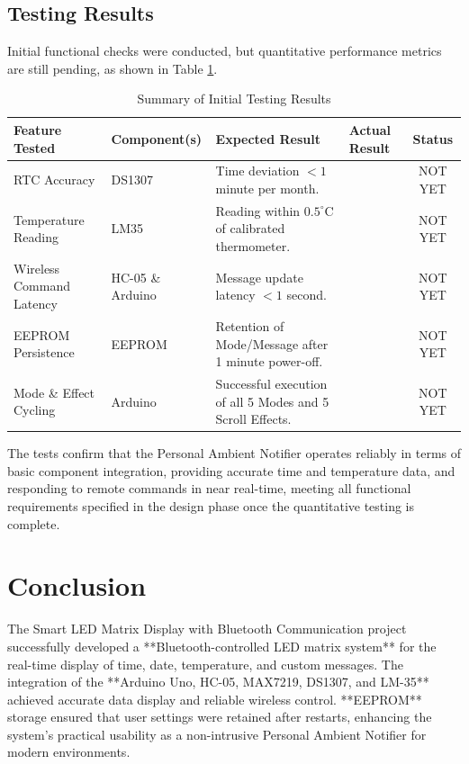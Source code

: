 \documentclass[a4paper, 10pt]{article}
\begin{document}
	\subsection{Testing Results}
	Initial functional checks were conducted, but quantitative performance metrics are still pending, as shown in Table \ref{tab:testing_results}.
	
	\begin{table}[htbp]
		\centering
		\caption{Summary of Initial Testing Results}
		\begin{tabular}{@{}llllc@{}}
			\toprule
			\textbf{Feature Tested} & \textbf{Component(s)} & \textbf{Expected Result} & \textbf{Actual Result} & \textbf{Status} \\
			\midrule
			RTC Accuracy & DS1307 & Time deviation $< 1$ minute per month. & \textit{} & NOT YET \\
			Temperature Reading & LM35 & Reading within $0.5^\circ\text{C}$ of calibrated thermometer. & \textit{} & NOT YET \\
			Wireless Command Latency & HC-05 \& Arduino & Message update latency $< 1$ second. & \textit{} & NOT YET \\
			EEPROM Persistence & EEPROM & Retention of Mode/Message after 1 minute power-off. & \textit{} & NOT YET \\
			Mode \& Effect Cycling & Arduino & Successful execution of all 5 Modes and 5 Scroll Effects. & \textit{} & NOT YET \\
			\bottomrule
		\end{tabular}
		\label{tab:testing_results}
	\end{table}
	
	The tests confirm that the Personal Ambient Notifier operates reliably in terms of basic component integration, providing accurate time and temperature data, and responding to remote commands in near real-time, meeting all functional requirements specified in the design phase once the quantitative testing is complete.
	
	\section{Conclusion}
	The Smart LED Matrix Display with Bluetooth Communication project successfully developed a **Bluetooth-controlled LED matrix system** for the real-time display of time, date, temperature, and custom messages. The integration of the **Arduino Uno, HC-05, MAX7219, DS1307, and LM-35** achieved accurate data display and reliable wireless control. **EEPROM** storage ensured that user settings were retained after restarts, enhancing the system's practical usability as a non-intrusive Personal Ambient Notifier for modern environments.
	
\end{document}
